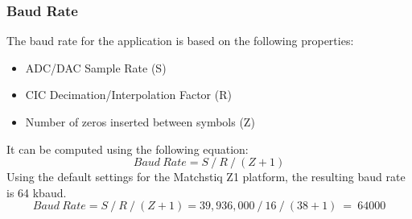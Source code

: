 \subsubsection{Baud Rate}
The baud rate for the application is based on the following properties:
	\begin{itemize}
		\item ADC/DAC Sample Rate (S)
		\item CIC Decimation/Interpolation Factor (R)
		\item Number of zeros inserted between symbols (Z)
	\end{itemize}
It can be computed using the following equation:
	      \begin{equation}
	      	Baud\ Rate = S\ /\ R\ /\ (Z +1)
	      \end{equation}
Using the default settings for the Matchstiq Z1 platform, the resulting baud rate is 64 kbaud.
	      \begin{equation}
	      	Baud\ Rate = S\ /\ R\ /\ (Z+1) = 39,936,000 \ /\ 16\ /\ (38+1) \ =\ 64000
	      \end{equation}
